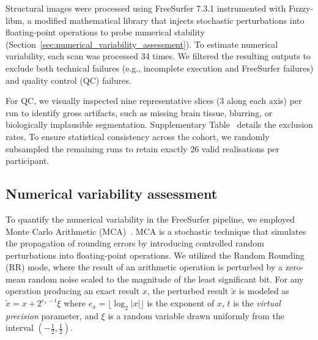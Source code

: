Structural images were processed using FreeSurfer 7.3.1 instrumented with
Fuzzy-libm, a modified mathematical library that injects stochastic
perturbations into floating-point operations to probe numerical stability
(Section~\ref{sec:numerical_variability_assessment}). To estimate numerical
variability, each scan was processed 34 times. We filtered the resulting
outputs to exclude both technical failures (e.g., incomplete execution and
FreeSurfer failures) and quality control (QC) failures.

For QC, we visually inspected nine representative slices (3 along each axis)
per run to identify gross artifacts, such as missing brain tissue, blurring, or
biologically implausible segmentation. Supplementary
Table~ details the exclusion rates. To ensure
statistical consistency across the cohort, we randomly subsampled the remaining
runs to retain exactly 26 valid realisations per participant.

\subsection{Numerical variability
    assessment\label{sec:numerical_variability_assessment}}

To quantify the numerical variability in the FreeSurfer pipeline, we employed
Monte Carlo Arithmetic (MCA)~\cite{parker1997monte}. MCA is a stochastic
technique that simulates the propagation of rounding errors by introducing
controlled random perturbations into floating-point operations. We utilized the
Random Rounding (RR) mode, where the result of an arithmetic operation is
perturbed by a zero-mean random noise scaled to the magnitude of the least
significant bit. For any operation producing an exact result $x$, the perturbed
result $\tilde{x}$ is modeled as $\tilde{x} = x + 2^{e_x - t}\xi$ where $e_x =
    \lfloor \log_2 |x| \rfloor$ is the exponent of $x$, $t$ is the \textit{virtual
    precision} parameter, and $\xi$ is a random variable drawn uniformly from the
interval $(-\frac{1}{2}, \frac{1}{2})$.

